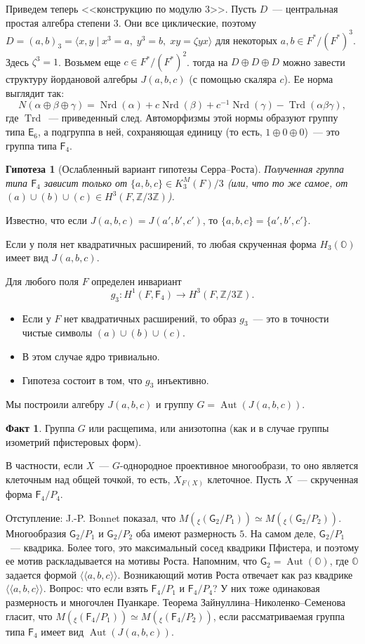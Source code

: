 \documentclass[a4paper]{article}
\DeclareMathOperator{\Aut}{Aut}
\DeclareMathOperator{\Nrd}{Nrd}
\DeclareMathOperator{\Trd}{Trd}
\newcommand{\isom}{\simeq}
\newtheorem{conjecture}[theorem]{Гипотеза}
\theoremstyle{definition}
\newtheorem{fact}[theorem]{Факт}
\newcommand{\la}{\langle}
\newcommand{\ra}{\rangle}
\newcommand{\lAngle}{\langle\!\langle}
\newcommand{\rAngle}{\rangle\!\rangle}
\begin{document}
Приведем теперь <<конструкцию по модулю $3$>>.
Пусть $D$~--- центральная простая алгебра степени $3$.
Они все циклические, поэтому
$D = (a,b)_3 = \la x,y\mid x^3 = a,\; y^3 = b,\; xy = \zeta yx\ra$
для некоторых $a,b\in F^*/(F^*)^3$.
Здесь $\zeta^3 = 1$.
Возьмем еще $c\in F^*/(F^*)^2$.
тогда на $D\oplus D\oplus D$ можно завести структуру йордановой
алгебры $J(a,b,c)$ (с помощью скаляра $c$).
Ее норма выглядит так:
\[
N(\alpha\oplus\beta\oplus\gamma) = \Nrd(\alpha) + c\Nrd(\beta)
+ c^{-1}\Nrd(\gamma) - \Trd(\alpha\beta\gamma),
\]
где $\Trd$~--- приведенный след.
Автоморфизмы этой нормы образуют группу типа $\mathsf{E}_6$,
а подгруппа в ней, сохраняющая
единицу (то есть, $1\oplus 0 \oplus 0$)~--- это группа типа
$\mathsf{F}_4$.

\begin{conjecture}[Ослабленный вариант гипотезы Серра--Роста]
Полученная группа типа $\mathsf{F}_4$ зависит только
от $\{a,b,c\} \in K_3^M(F)/3$
(или, что то же самое, от
$(a)\cup (b)\cup (c) \in H^3(F,\mathbb{Z}/3\mathbb{Z})$).
\end{conjecture}
Известно, что если $J(a,b,c) = J(a',b',c')$, то
$\{a,b,c\} = \{a',b',c'\}$.

Если у поля нет квадратичных расширений, то любая скрученная
форма $H_3(\mathbb O)$ имеет вид
$J(a,b,c)$.

Для любого поля $F$ определен инвариант
\[
g_3\colon H^1(F, \mathsf{F}_4) \to H^3(F, \mathbb{Z}/3\mathbb{Z}).
\]
\begin{itemize}
\item Если у $F$ нет квадратичных расширений, то образ $g_3$~--- это
в точности чистые символы $(a)\cup (b)\cup (c)$.
\item В этом случае ядро тривиально.
\item Гипотеза состоит в том, что $g_3$ инъективно.
\end{itemize}
Мы построили алгебру $J(a,b,c)$ и группу $G = \Aut(J(a,b,c))$.
\begin{fact}
Группа $G$ или расщепима, или анизотопна (как и в случае группы
изометрий пфистеровых форм).
\end{fact}
В частности, если $X$~--- $G$-однородное проективное многообрази,
то оно является клеточным над общей точкой,
то есть, $X_{F(X)}$ клеточное.
Пусть $X$~--- скрученная форма $\mathsf{F}_4/P_4$.

Отступление: J.-P. Bonnet показал, что
$M({}_{\xi}(\mathsf{G}_2/P_1)) \isom M({}_{\xi}(\mathsf{G}_2/P_2))$.
Многообразия $\mathsf{G}_2/P_1$ и $\mathsf{G}_2/P_2$
оба имеют размерность $5$.
На самом деле, $\mathsf{G}_2/P_1$~--- квадрика.
Более того, это максимальный сосед квадрики Пфистера, и поэтому
ее мотив раскладывается на мотивы Роста.
Напомним, что $\mathsf{G}_2 = \Aut(\mathbb{O})$,
где $\mathbb{O}$ задается формой $\lAngle a, b, c\rAngle$.
Возникающий мотив Роста отвечает как раз квадрике
$\lAngle a, b, c\rAngle$.
Вопрос: что если взять $\mathsf{F}_4/P_1$ и $\mathsf{F}_4/P_4$?
У них тоже одинаковая размерность и многочлен Пуанкаре.
Теорема Зайнуллина--Николенко--Семенова гласит,
что
$M({}_{\xi}(\mathsf{F}_4/P_1)) \isom M({}_{\xi}(\mathsf{F}_4/P_2))$,
если рассматриваемая группа типа $\mathsf{F}_4$ имеет вид
$\Aut(J(a,b,c))$.
\end{document}
